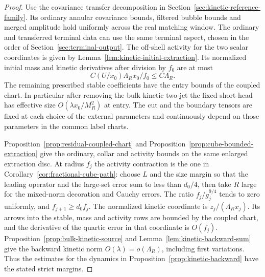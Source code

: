 \documentclass[11pt]{article}
\theoremstyle{definition}
\begin{document}
\begin{proof}
Use the covariance transfer decomposition in
Section~\ref{sec:kinetic-reference-family}. Its ordinary
annular covariance bounds, filtered bubble bounds and
merged amplitude hold uniformly across the real matching
window. The ordinary and transferred terminal data can
use the same terminal aspect, chosen in the order of
Section~\ref{sec:terminal-output}. The off-shell activity
for the two scalar coordinates is given by
Lemma~\ref{lem:kinetic-initial-extraction}.
Its normalized initial mass and kinetic derivatives
after division by \(f_0\) are at most
\begin{equation}
 C(U/x_0)\Lambda_R x_0/f_0\le C\Lambda_R .
\end{equation}
The remaining prescribed stable coefficients have the
entry bounds of the coupled chart. In particular after
removing the bulk kinetic two-jet the fixed short head
has effective size \(O(\lambda x_0/M_R^2)\) at entry.
The cut and the boundary tensors are fixed at each choice
of the external parameters and continuously depend on
those parameters in the common label charts.

Proposition~\ref{prop:residual-coupled-chart} and
Proposition~\ref{prop:cube-bounded-extraction} give the
ordinary, collar and activity bounds on the same enlarged
extraction disc. At radius \(f_j\) the activity contraction
is the one in Corollary~\ref{cor:fractional-cube-path}:
choose \(L\) and the size margin so that the leading operator
and the large-set error sum to less than \(d_0/4\), then
take \(R\) large for the mixed-norm decoration and
Cauchy errors. The ratio \(f_j/g_j^{9/4}\) tends to zero
uniformly, and \(f_{j+1}\ge d_0 f_j\). The normalized
kinetic coordinate is \(z_j/(\Lambda_R x_j)\). Its arrows
into the stable, mass and activity rows are bounded by
the coupled chart, and the derivative of the quartic
error in that coordinate is \(O(f_j)\).
Proposition~\ref{prop:bulk-kinetic-source} and
Lemma~\ref{lem:kinetic-backward-sum} give the backward
kinetic norm \(O(\lambda)=o(\Lambda_R)\), including
first variations. Thus the estimates for the dynamics in
Proposition~\ref{prop:kinetic-backward} have the stated
strict margins.


\end{proof}
\end{document}
